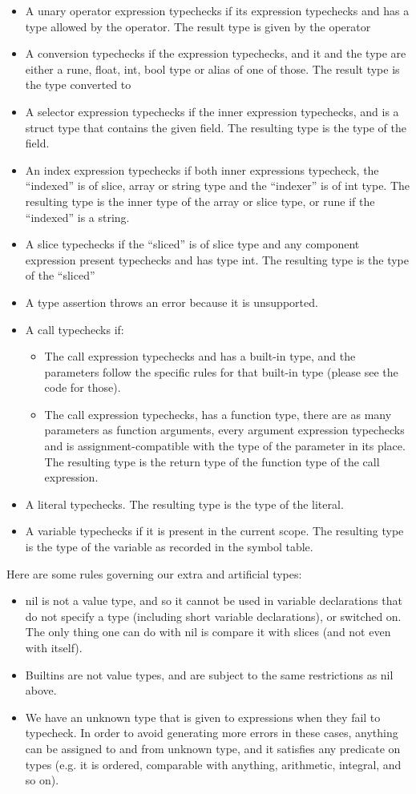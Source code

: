 \documentclass[letterpaper,11pt]{article}
\begin{document}
\begin{itemize}
\item A unary operator expression typechecks if its expression typechecks and has a type allowed by the operator. The result type is given by the operator
\item A conversion typechecks if the expression typechecks, and it and the type are either a rune, float, int, bool type or alias of one of those. The result type is the type converted to
\item A selector expression typechecks if the inner expression typechecks, and is a struct type that contains the given field. The resulting type is the type of the field.
\item An index expression typechecks if both inner expressions typecheck, the ``indexed'' is of slice, array or string type and the ``indexer'' is of int type. The resulting type is the inner type of the array or slice type, or rune if the ``indexed'' is a string.
\item A slice typechecks if the ``sliced'' is of slice type and any component expression present typechecks and has type int. The resulting type is the type of the ``sliced''
\item A type assertion throws an error because it is unsupported.
\item A call typechecks if:
	\begin{itemize}
	\item The call expression typechecks and has a built-in type, and the parameters follow the specific rules for that built-in type (please see the code for those).
	\item The call expression typechecks, has a function type, there are as many parameters as function arguments, every argument expression typechecks and is assignment-compatible with the type of the parameter in its place. The resulting type is the return type of the function type of the call expression.
	\end{itemize}
\item A literal typechecks. The resulting type is the type of the literal.
\item A variable typechecks if it is present in the current scope. The resulting type is the type of the variable as recorded in the symbol table.
\end{itemize}

Here are some rules governing our extra and artificial types:
\begin{itemize}
\item nil is not a value type, and so it cannot be used in variable declarations that do not specify a type (including short variable declarations), or switched on. The only thing one can do with nil is compare it with slices (and not even with itself).
\item Builtins are not value types, and are subject to the same restrictions as nil above.
\item We have an unknown type that is given to expressions when they fail to typecheck. In order to avoid generating more errors in these cases, anything can be assigned to and from unknown type, and it satisfies any predicate on types (e.g. it is ordered, comparable with anything, arithmetic, integral, and so on).
\end{itemize}
\end{document}
